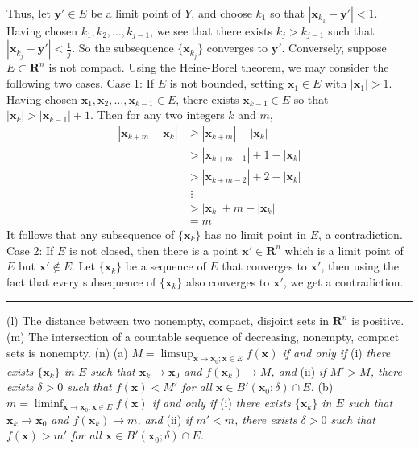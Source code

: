 \documentclass[12pt]{article}
\theoremstyle{definition}
\begin{document}
Thus, let $\mathbf{y}'\in E$ be a limit point of $Y$, and choose $k_1$ so that $\left\vert\mathbf{x}_{k_1}-\mathbf{y}'\right\vert<1$. Having chosen $k_1,k_2,\ldots,k_{j-1}$, we see that there exists $k_j>k_{j-1}$ such that $\left\vert\mathbf{x}_{k_j}-\mathbf{y}'\right\vert<\frac{1}{j}$. So the subsequence $\{\mathbf{x}_{k_j}\}$ converges to $\mathbf{y}'$. Conversely, suppose $E\subset\mathbf{R}^n$ is not compact. Using the Heine-Borel theorem, we may consider the following two cases.
Case 1: If $E$ is not bounded, setting $\mathbf{x}_1\in E$ with $\left\vert\mathbf{x}_1\right\vert>1$. Having chosen $\mathbf{x}_1,\mathbf{x}_2,\ldots,\mathbf{x}_{k-1}\in E$, there exists $\mathbf{x}_{k-1}\in E$ so that $\left\vert\mathbf{x}_k\right\vert>\left\vert\mathbf{x}_{k-1}\right\vert+1$. Then for any two integers $k$ and $m$,
\begin{align*}
\left\vert\mathbf{x}_{k+m}-\mathbf{x}_k\right\vert
&\ge \left\vert\mathbf{x}_{k+m}\right\vert-\left\vert\mathbf{x}_k\right\vert \\
&> \left\vert\mathbf{x}_{k+m-1}\right\vert+1-\left\vert\mathbf{x}_k\right\vert \\
&>\left\vert\mathbf{x}_{k+m-2}\right\vert+2-\left\vert\mathbf{x}_k\right\vert \\
&\,\,\vdots \\
&>\left\vert\mathbf{x}_{k}\right\vert+m-\left\vert\mathbf{x}_k\right\vert \\
&=m
\end{align*}
It follows that any subsequence of $\{\mathbf{x}_k\}$ has no limit point in $E$, a contradiction.
Case 2: If $E$ is not closed, then there is a point $\mathbf{x}'\in \mathbf{R}^n$ which is a limit point of $E$ but $\mathbf{x}'\notin E$. Let $\{\mathbf{x}_k\}$ be a sequence of $E$ that converges to $\mathbf{x}'$, then using the fact that every subsequence of $\{\mathbf{x}_k\}$ also converges to $\mathbf{x}'$, we get a contradiction.


\bigskip\noindent\hrule\bigskip

(l) The distance between two nonempty, compact, disjoint sets in $\mathbf{R}^n$ is positive.
(m) The intersection of a countable sequence of decreasing, nonempty, compact sets is nonempty.
(n) 
(a) \textit{$M=\limsup_{\mathbf{x}\to\mathbf{x}_0; \mathbf{x}\in E}f(\mathbf{x})$ if and only if} (i) \textit{there exists $\{\mathbf{x}_k\}$ in $E$ such that $\mathbf{x}_k\to\mathbf{x}_0$ and $f(\mathbf{x}_k)\to M$, and} (ii) \textit{if $M'>M$, there exists $\delta>0$ such that $f(\mathbf{x})<M'$ for all $\mathbf{x}\in B'(\mathbf{x}_0;\delta)\cap E$.}
(b) \textit{$m=\liminf_{\mathbf{x}\to\mathbf{x}_0; \mathbf{x}\in E}f(\mathbf{x})$ if and only if} (i) \textit{there exists $\{\mathbf{x}_k\}$ in $E$ such that $\mathbf{x}_k\to\mathbf{x}_0$ and $f(\mathbf{x}_k)\to m$, and} (ii) \textit{if $m'<m$, there exists $\delta>0$ such that $f(\mathbf{x})>m'$ for all $\mathbf{x}\in B'(\mathbf{x}_0;\delta)\cap E$.}
\end{document}
